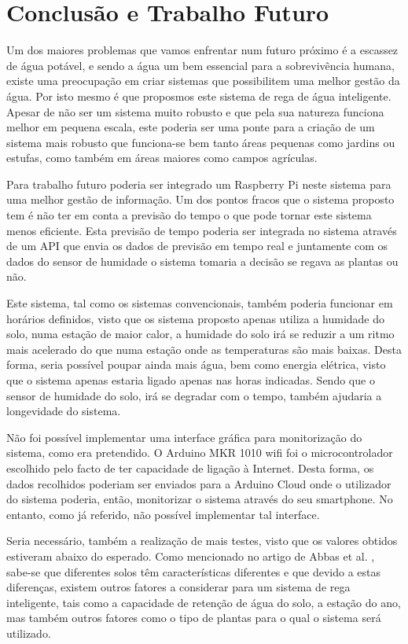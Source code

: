 \documentclass[conference]{IEEEtran}
\begin{document}
\section{Conclusão e Trabalho Futuro}

Um dos maiores problemas que vamos enfrentar num futuro próximo é a escassez de água potável,
e sendo a água um bem essencial para a sobrevivência humana, existe uma preocupação 
em criar sistemas que possibilitem uma melhor gestão da água. Por isto mesmo 
é que proposmos este sistema de rega de água inteligente. Apesar de não ser um 
sistema muito robusto e que pela sua natureza funciona melhor em pequena escala, este 
poderia ser uma ponte para a criação de um sistema mais robusto que funciona-se bem 
tanto áreas pequenas como jardins ou estufas, como também em áreas maiores como campos agrículas.

Para trabalho futuro poderia ser integrado um Raspberry Pi neste sistema para uma melhor 
gestão de informação. Um dos pontos fracos que o sistema proposto tem é não 
ter em conta a previsão do tempo o que pode tornar este sistema menos eficiente. 
Esta previsão de tempo poderia ser integrada no sistema através de um API que 
envia os dados de previsão em tempo real e juntamente com os dados do sensor de 
humidade o sistema tomaria a decisão se regava as plantas ou não.

Este sistema, tal como os sistemas convencionais, também poderia funcionar em horários definidos, 
visto que os sistema proposto apenas utiliza a humidade do solo, numa estação de maior calor, a humidade do solo 
irá se reduzir a um ritmo mais acelerado do que numa estação onde as temperaturas são mais baixas. Desta forma, 
seria possível poupar ainda mais água, bem como energia elétrica, visto que o sistema apenas estaria ligado apenas 
nas horas indicadas. Sendo que o sensor de humidade do solo, irá se degradar com o tempo, também ajudaria a 
longevidade do sistema.

Não foi possível implementar uma interface gráfica para monitorização do sistema, como era pretendido. 
O Arduino MKR 1010 wifi foi o microcontrolador escolhido pelo facto de ter capacidade de ligação à Internet. 
Desta forma, os dados recolhidos poderiam ser enviados para a Arduino Cloud onde o utilizador do sistema poderia, 
então, monitorizar o sistema através do seu smartphone. No entanto, como já referido, não possível 
implementar tal interface.

Seria necessário, também a realização de mais testes, visto que os valores obtidos estiveram abaixo do 
esperado. Como mencionado no artigo de Abbas et al. \cite{abbas2014smart}, 
sabe-se que diferentes solos têm características diferentes e que devido a estas diferenças, existem outros 
fatores a considerar para um sistema de rega inteligente, tais como a capacidade de retenção de água do solo, 
a estação do ano, mas também outros fatores como o tipo de plantas para o qual o sistema será utilizado.
\end{document}
